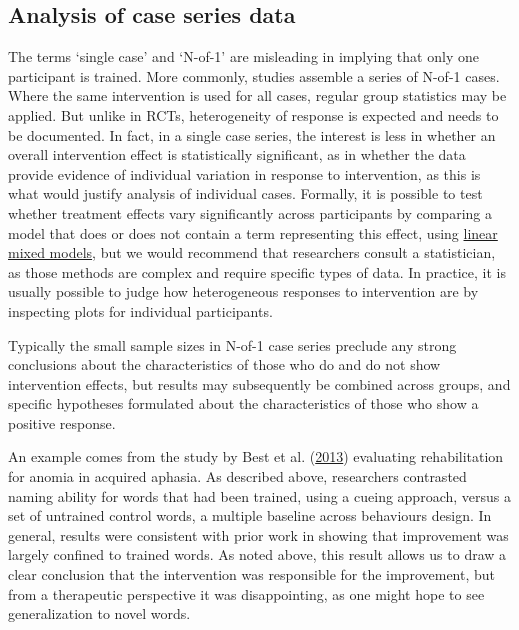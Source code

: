 \documentclass{krantz}
\begin{document}
\hypertarget{analysis-of-case-series-data}{%
\subsection{Analysis of case series data}\label{analysis-of-case-series-data}}

The terms `single case' and `N-of-1' are misleading in implying that only one participant is trained. More commonly, studies assemble a series of N-of-1 cases. Where the same intervention is used for all cases, regular group statistics may be applied. But unlike in RCTs, heterogeneity of response is expected and needs to be documented. In fact, in a single case series, the interest is less in whether an overall intervention effect is statistically significant, as in whether the data provide evidence of individual variation in response to intervention, as this is what would justify analysis of individual cases. Formally, it is possible to test whether treatment effects vary significantly across participants by comparing a model that does or does not contain a term representing this effect, using \href{https://stackoverflow.com/questions/24019807/how-to-compare-a-model-with-no-random-effects-to-a-model-with-a-random-effect-us}{linear mixed models}, but we would recommend that researchers consult a statistician, as those methods are complex and require specific types of data. In practice, it is usually possible to judge how heterogeneous responses to intervention are by inspecting plots for individual participants.

Typically the small sample sizes in N-of-1 case series preclude any strong conclusions about the characteristics of those who do and do not show intervention effects, but results may subsequently be combined across groups, and specific hypotheses formulated about the characteristics of those who show a positive response.

An example comes from the study by Best et al. (\protect\hyperlink{ref-best2013}{2013}) evaluating rehabilitation for anomia in acquired aphasia. As described above, researchers contrasted naming ability for words that had been trained, using a cueing approach, versus a set of untrained control words, a multiple baseline across behaviours design. In general, results were consistent with prior work in showing that improvement was largely confined to trained words. As noted above, this result allows us to draw a clear conclusion that the intervention was responsible for the improvement, but from a therapeutic perspective it was disappointing, as one might hope to see generalization to novel words.
\end{document}
